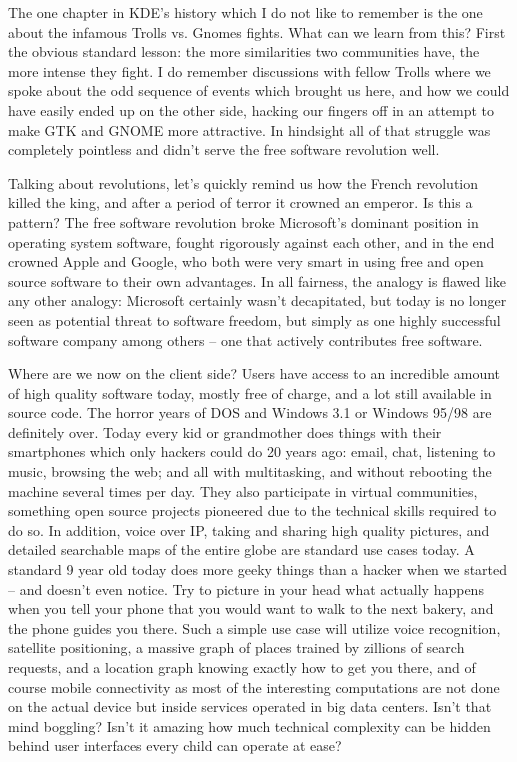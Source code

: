 The one chapter in KDE’s history which I do not like to remember is the one about the infamous Trolls vs. Gnomes fights. What can we learn from this?  First the obvious standard lesson: the more similarities two communities have, the more intense they fight. I do remember discussions with fellow Trolls where we spoke about the odd sequence of events which brought us here, and how we could have easily ended up on the other side, hacking our fingers off in an attempt to make GTK and GNOME more attractive. In hindsight all of that struggle was completely pointless and didn’t serve the free software revolution well.
 
Talking about revolutions, let’s quickly remind us how the French revolution killed the king, and after a period of terror it crowned an emperor. Is this a pattern? The free software revolution broke Microsoft’s dominant position in operating system software, fought rigorously against each other, and in the end crowned Apple and Google, who both were very smart in using free and open source software to their own advantages. In all fairness, the analogy is flawed like any other analogy: Microsoft certainly wasn’t decapitated, but today is no longer seen as potential threat to software freedom, but simply as one highly successful software company among others – one that actively contributes free software.
 
Where are we now on the client side? Users have access to an incredible amount of high quality software today, mostly free of charge, and a lot still available in source code. The horror years of DOS and Windows 3.1 or Windows 95/98 are definitely over. Today every kid or grandmother does things with their smartphones which only hackers could do 20 years ago: email, chat, listening to music, browsing the web; and all with multitasking, and without rebooting the machine several times per day.  They also participate in virtual communities, something open source projects pioneered due to the technical skills required to do so. In addition, voice over IP, taking and sharing high quality pictures, and detailed searchable maps of the entire globe are standard use cases today. A standard 9 year old today does more geeky things than a hacker when we started – and doesn’t even notice. Try to picture in your head what actually happens when you tell your phone that you would want to walk to the next bakery, and the phone guides you there. Such a simple use case will utilize voice recognition, satellite positioning, a massive graph of places trained by zillions of search requests, and a location graph knowing exactly how to get you there, and of course mobile connectivity as most of the interesting computations are not done on the actual device but inside services operated in big data centers. Isn’t that mind boggling? Isn’t it amazing how much technical complexity can be hidden behind user interfaces every child can operate at ease?
 
